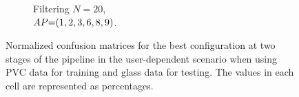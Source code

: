 \begin{figure}[ht]
\begin{subfigure}{.49\textwidth}
      \vspace{-15pt}
      \captionsetup{width=.99\linewidth}
      \caption{Filtering $N{=}20$, \\ $\splitatcommas{AP{=}(1, 2, 3, 6, 8, 9)}$.}
      \label{fig:radar-experiments:through-materials:pvc-glass-confusion:filtering-ud}
  \end{subfigure}
  
  \vspace{-6pt}
  \caption{Normalized confusion matrices for the best configuration at two stages of the pipeline in the user-dependent scenario when using PVC data for training and glass data for testing. The values in each cell are represented as percentages.}
  \label{fig:radar-experiments:through-materials:pvc-glass-confusion}
\end{figure}

